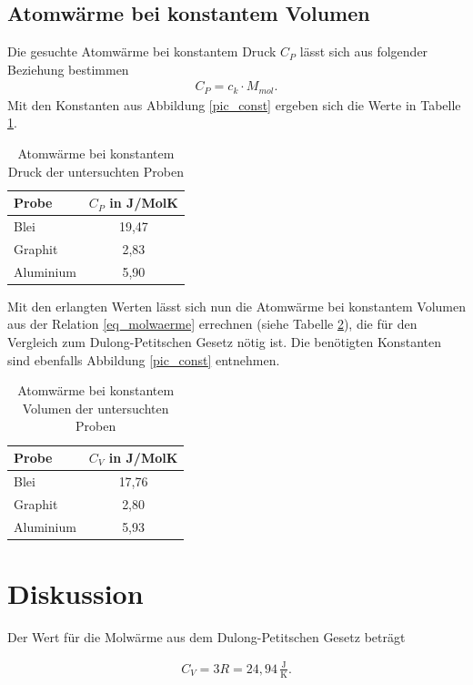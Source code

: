 \subsection{Atomwärme bei konstantem Volumen}
\label{sec_atomwaerme}
Die gesuchte Atomwärme bei konstantem Druck $C_P$ lässt sich aus folgender Beziehung bestimmen
\begin{align}
 C_P = c_k \cdot M_{mol}.
\end{align}
Mit den Konstanten aus Abbildung \ref{pic_const} ergeben sich die Werte in Tabelle \ref{tab_cp}.
\begin{table}[H]
 \begin{tabular}{l|c}
 Probe & $C_P$ in J/MolK\\
 \hline
Blei &19,47\\
Graphit &2,83\\
Aluminium &5,90
 \end{tabular}
\caption{Atomwärme bei konstantem Druck der untersuchten Proben}
\label{tab_cp}
\end{table}
Mit den erlangten Werten lässt sich nun die Atomwärme bei konstantem Volumen aus der Relation \eqref{eq_molwaerme} errechnen 
(siehe Tabelle \ref{tab_cv}), die für den Vergleich zum Dulong-Petitschen Gesetz nötig ist. Die benötigten Konstanten sind ebenfalls 
Abbildung \ref{pic_const} entnehmen.
\begin{table}[H]
 \begin{tabular}{l|c}
 Probe & $C_V$ in J/MolK\\
 \hline
Blei &17,76\\
Graphit &2,80\\
Aluminium &5,93
\end{tabular}
\caption{Atomwärme bei konstantem Volumen der untersuchten Proben}
\label{tab_cv}
\end{table}

\section{Diskussion}
Der Wert für die Molwärme aus dem Dulong-Petitschen Gesetz beträgt

\begin{align}
 C_V = 3R = 24,94  \, \frac{\text{J}}{\text{K}}.
\end{align}

